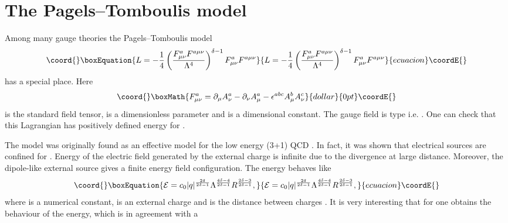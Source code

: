 \documentclass[a4 paper, 12 pt] {article}
\begin{document}
\section{\bf{The Pagels--Tomboulis model}}
Among many gauge theories the Pagels--Tomboulis model \cite{Pagels}
\begin{equation}\coord{}\boxEquation{
L= -\frac{1}{4} \left( \frac{F_{\mu \nu }^a F^{a \mu \nu
}}{\Lambda^4} \right)^{\delta-1} F_{\mu \nu }^a F^{a \mu \nu }
\label{pagels}
}{
L= -\frac{1}{4} \left( \frac{F_{\mu \nu }^a F^{a \mu \nu
}}{\Lambda^4} \right)^{\delta-1} F_{\mu \nu }^a F^{a \mu \nu }
}{ecuacion}\coordE{}\end{equation}
has a special place. Here $$\coord{}\boxMath{F_{\mu \nu }^a=\partial_{\mu } A_{\nu
}^a -\partial_{\nu } A_{\mu }^a -\epsilon^{abc} A^b_{\mu }
A^c_{\nu }}{dollar}{0pt}\coordE{}$$ is the standard field tensor, \myHighlight{$\delta $}\coordHE{} is a
dimensionless parameter and \myHighlight{$\Lambda $}\coordHE{} is a dimensional constant.
The gauge field is \coordHE{} type i.e. \coordHE{}. One can check that
this Lagrangian has positively defined energy for \coordHE{}.
\par
The model was originally found as an effective model for the low
energy (3+1) QCD \cite{Pagels}. In fact, it was shown that
electrical sources are confined for \coordHE{}.
Energy of the electric field generated by the external charge is
infinite due to the divergence at large distance. Moreover, the
dipole-like external source gives a finite energy field
configuration. The energy \coordHE{} behaves like
\begin{equation}\coord{}\boxEquation{
\mathcal{E} = c_0 |q|^{\frac{2 \delta }{2\delta -1 }}
\Lambda^{\frac{4\delta -4}{2\delta -1}} R^{\frac{2\delta
-3}{2\delta -1}}, \label{energypagels}
}{
\mathcal{E} = c_0 |q|^{\frac{2 \delta }{2\delta -1 }}
\Lambda^{\frac{4\delta -4}{2\delta -1}} R^{\frac{2\delta
-3}{2\delta -1}}, }{ecuacion}\coordE{}\end{equation}
where \coordHE{} is a numerical constant, \coordHE{} is an external charge and
\coordHE{} is the distance between charges \cite{My1}. It is very
interesting that for \coordHE{} one obtains the
\coordHE{} behaviour of the energy, which is in agreement with a
\end{document}
